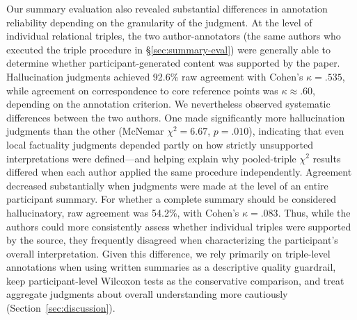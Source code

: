 \documentclass[manuscript,review,anonymous]{acmart}
\begin{document}
Our summary evaluation also revealed substantial differences in annotation reliability depending on the granularity of the judgment. At the level of individual relational triples, the two author-annotators (the same authors who executed the triple procedure in \S\ref{sec:summary-eval}) were generally able to determine whether participant-generated content was supported by the paper. Hallucination judgments achieved 92.6\% raw agreement with Cohen's $\kappa=.535$, while agreement on correspondence to core reference points was $\kappa\approx.60$, depending on the annotation criterion. We nevertheless observed systematic differences between the two authors. One made significantly more hallucination judgments than the other (McNemar $\chi^2=6.67$, $p=.010$), indicating that even local factuality judgments depended partly on how strictly unsupported interpretations were defined---and helping explain why pooled-triple $\chi^2$ results differed when each author applied the same procedure independently. Agreement decreased substantially when judgments were made at the level of an entire participant summary. For whether a complete summary should be considered hallucinatory, raw agreement was 54.2\%, with Cohen's $\kappa=.083$. Thus, while the authors could more consistently assess whether individual triples were supported by the source, they frequently disagreed when characterizing the participant's overall interpretation. Given this difference, we rely primarily on triple-level annotations when using written summaries as a descriptive quality guardrail, keep participant-level Wilcoxon tests as the conservative comparison, and treat aggregate judgments about overall understanding more cautiously (Section~\ref{sec:discussion}).







\end{document}

